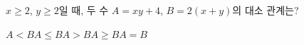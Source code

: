 $x\ge 2$, $y\ge 2$일 때, 두 수 $A=xy+4$, $B=2(x+y)$의 대소 관계는?
\begin{choices32}{$A<B$}{$A\le B$}{$A>B$}{$A\ge B$}{$A=B$}\end{choices32}
